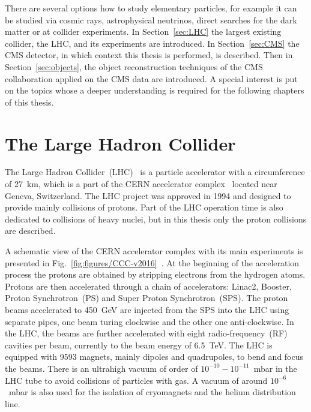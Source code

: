\clearpage

\setcounter{secnumdepth}{4}
\setcounter{secnumdepth}{5}

There are several options how to study elementary particles, for example it can be studied via cosmic rays, astrophysical neutrinos, direct searches for the dark matter or at collider experiments. In Section~\ref{sec:LHC} the largest existing collider, the LHC, and its experiments are introduced. In Section~\ref{sec:CMS} the CMS detector, in which context this thesis is performed, is described. Then in Section~\ref{sec:objects}, the object reconstruction techniques of the CMS collaboration applied on the CMS data are introduced. A special interest is put on the topics whose a deeper understanding is required for the following chapters of this thesis.

\section{The Large Hadron Collider~\label{sec:LHC}}

The Large Hadron Collider~(LHC)~\cite{CERN-Brochure-2017-002-Eng, Evans:2008zzb} is a particle accelerator with a circumference of 27~km, which is a part of the CERN accelerator complex~\cite{Bruning:2004ej} located near Geneva, Switzerland. The LHC project was approved in 1994 and designed to provide mainly collisions of protons. Part of the LHC operation time is also dedicated to collisions of heavy nuclei, but in this thesis only the proton collisions are described.

A schematic view of the CERN accelerator complex with its main experiments is presented in Fig.~\ref{fig:figures/CCC-v2016}~\cite{Mobs:2225847}. At the beginning of the acceleration process the protons are obtained by stripping electrons from the hydrogen atoms. Protons are then accelerated through a chain of accelerators: Linac2, Booster, Proton Synchrotron~(PS) and Super Proton Synchrotron~(SPS). The proton beams accelerated to 450~GeV are injected from the SPS into the LHC using separate pipes, one beam turing clockwise and the other one anti-clockwise. In the LHC, the beams are further accelerated with eight radio-frequency~(RF) cavities per beam, currently to the beam energy of 6.5~TeV. The LHC is equipped with 9593 magnets, mainly dipoles and quadrupoles, to bend and focus the beams. There is an ultrahigh vacuum of order of $10^{-10}-10^{-11}$~mbar in the LHC tube to avoid collisions of particles with gas. A vacuum of around $10^{-6}$~mbar is also used for the isolation  of cryomagnets and the helium distribution line.

